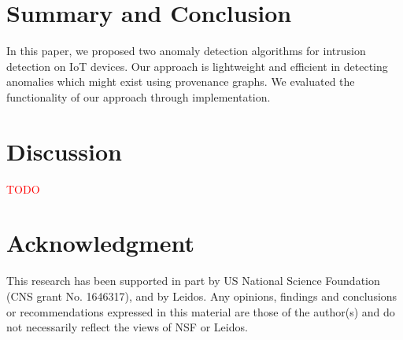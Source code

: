 \section{Summary and Conclusion}

In this paper, we proposed two anomaly detection algorithms for intrusion detection on IoT devices. Our approach is lightweight and efficient in detecting anomalies which might exist using provenance graphs. We evaluated the functionality of our approach through implementation.


\section{Discussion}

\textcolor{red}{TODO}

\section{Acknowledgment}
This research has been supported in part by US National Science Foundation (CNS grant No. 1646317), and by Leidos. Any opinions, findings and conclusions or recommendations expressed in this material are those of the author(s) and do not necessarily reflect the views of NSF or Leidos.



